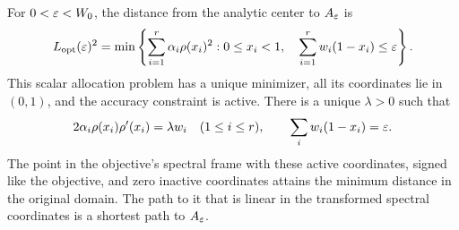 \begin{theorem}
\label{thm:water-filling}
For $0<\varepsilon<W_0$, the distance from the analytic center to
$A_\varepsilon$ is
\begin{equation}
 L_{\mathrm{opt}}(\varepsilon)^2
 =\min\left\{\sum_{i=1}^r\alpha_i\rho(x_i)^2:
      0\leq x_i<1,\quad\sum_{i=1}^r w_i(1-x_i)\leq\varepsilon\right\}.
 \label{eq:water-filling}
\end{equation}
This scalar allocation problem has a unique minimizer, all its
coordinates lie in $(0,1)$, and the accuracy constraint is active.
There is a unique
$\lambda>0$ such that
\begin{equation}
 2\alpha_i\rho(x_i)\rho'(x_i)=\lambda w_i\quad(1\leq i\leq r),
 \qquad \sum_iw_i(1-x_i)=\varepsilon.
 \label{eq:water-KKT}
\end{equation}
The point in the objective's spectral frame with these active
coordinates, signed like the objective, and zero inactive coordinates
attains the minimum distance in the original domain. The path to it
that is linear in the transformed spectral coordinates is a shortest
path to $A_\varepsilon$.
\end{theorem}
